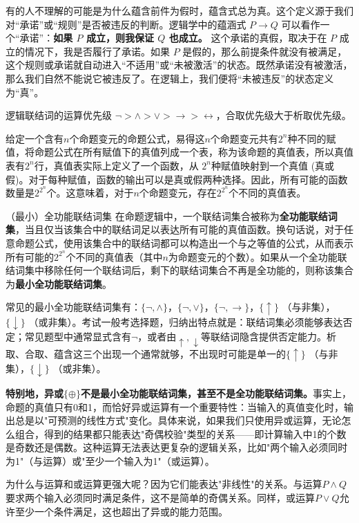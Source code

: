 \documentclass[lang=cn,11pt]{elegantbook}
\begin{document}
有的人不理解的可能是为什么蕴含前件为假时，蕴含式总为真。这个定义源于我们对“承诺”或“规则”是否被违反的判断。逻辑学中的蕴涵式 $P \rightarrow Q$ 可以看作一个“承诺”：\textbf{如果 $P$ 成立，则我保证 $Q$ 也成立。} 这个承诺的真假，取决于在 $P$ 成立的情况下，我是否履行了承诺。如果 $P$ 是假的，那么前提条件就没有被满足，这个规则或承诺就自动进入“不适用”或“未被激活”的状态。既然承诺没有被激活，那么我们自然不能说它被违反了。在逻辑上，我们便将“未被违反”的状态定义为“真”。
\begin{definition}{逻辑联结词的运算优先级}
    $\neg> \land> \lor> \rightarrow> \leftrightarrow$，合取优先级大于析取优先级。
\end{definition}
给定一个含有$n$个命题变元的命题公式，易得这$n$个命题变元共有$2^n$种不同的赋值，将命题公式在所有赋值下的真值列成一个表，称为该命题的真值表，所以真值表有$2^n$行，真值表实际上定义了一个函数，从 $2^n$种赋值映射到一个真值 (真或假)。对于每种赋值，函数的输出可以是真或假两种选择。因此，所有可能的函数数量是$2^{2^n}$个。这意味着，对于$n$个命题变元，存在$2^{2^n}$个不同的真值表。
\begin{definition}{（最小）全功能联结词集}
    在命题逻辑中，一个联结词集合被称为\textbf{全功能联结词集}，当且仅当该集合中的联结词足以表达所有可能的真值函数。换句话说，对于任意命题公式，使用该集合中的联结词都可以构造出一个与之等值的公式，从而表示所有可能的$2^{2^n}$个不同的真值表（其中$n$为命题变元的个数）。如果从一个全功能联结词集中移除任何一个联结词后，剩下的联结词集合不再是全功能的，则称该集合为\textbf{最小全功能联结词集}。
\end{definition}
常见的最小全功能联结词集有：$\{\neg, \land\}$，$\{\neg, \lor\}$，$\{\neg, \rightarrow\}$，$\{\uparrow\}$ （与非集），$\{\downarrow\}$ （或非集）。考试一般考选择题，归纳出特点就是：联结词集必须能够表达否定；常见题型中通常显式含有$\neg$，或者由$\uparrow,\downarrow$等联结词隐含提供否定能力。析取、合取、蕴含这三个出现一个通常就够，不出现时可能是单一的$\{\uparrow\}$ （与非集），$\{\downarrow\}$ （或非集）。

\textbf{特别地，异或$\{\oplus\}$不是最小全功能联结词集，甚至不是全功能联结词集。}事实上，命题的真值只有0和1，而恰好异或运算有一个重要特性：当输入的真值变化时，输出总是以"可预测的线性方式"变化。具体来说，如果我们只使用异或运算，无论怎么组合，得到的结果都只能表达"奇偶校验"类型的关系——即计算输入中1的个数是奇数还是偶数。这种运算无法表达更复杂的逻辑关系，比如"两个输入必须同时为1"（与运算）或"至少一个输入为1"（或运算）。

为什么与运算和或运算更强大呢？因为它们能表达"非线性"的关系。与运算$P \land Q$要求两个输入必须同时满足条件，这不是简单的奇偶关系。同样，或运算$P \lor Q$允许至少一个条件满足，这也超出了异或的能力范围。
\end{document}
